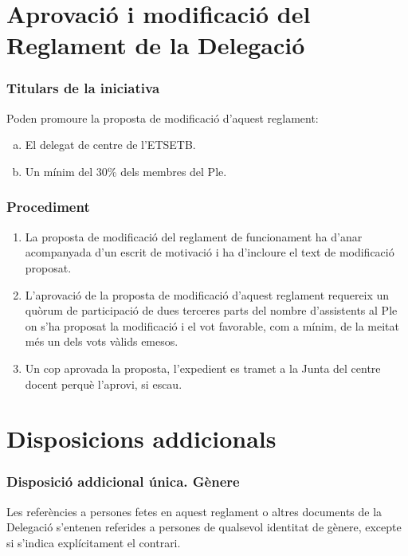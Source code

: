 \documentclass[a4paper,12pt]{article}
\renewcommand*{\thesubsubsection}{\arabic{subsubsection}}
\begin{document}
\section{Aprovació i modificació del Reglament de la Delegació}
\subsubsection{Titulars de la iniciativa}
Poden promoure la proposta de modificació d'aquest reglament:
\begin{enumerate}[a)]
	\item El delegat de centre de l'ETSETB.
	\item Un mínim del 30\% dels membres del Ple.
\end{enumerate}

\subsubsection{Procediment}
\begin{enumerate}[\thesubsubsection.1]
	\item La proposta de modificació del reglament de funcionament ha d'anar acompanyada d'un escrit de motivació i ha d'incloure el text de modificació proposat.
	\item L'aprovació de la proposta de modificació d'aquest reglament requereix un quòrum de participació de dues terceres parts del nombre d'assistents al Ple on s'ha proposat la modificació i el vot favorable, com a mínim, de la meitat més un dels vots vàlids emesos.
	\item Un cop aprovada la proposta, l'expedient es tramet a la Junta del centre docent perquè l'aprovi, si escau.
\end{enumerate}
\newpage

\section*{Disposicions addicionals}

\subsubsection*{Disposició addicional única. Gènere}
Les referències a persones fetes en aquest reglament o altres documents de la Delegació s'entenen referides a persones de qualsevol identitat de gènere, excepte si s'indica explícitament el contrari.
\end{document}
